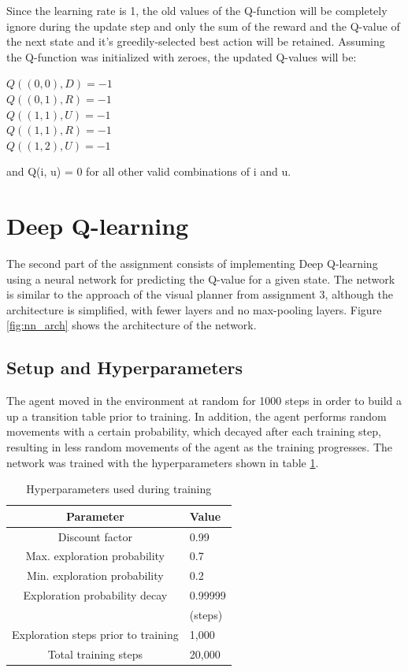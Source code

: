 \documentclass[a4paper, 11pt]{article}
\begin{document}
Since the learning rate is 1, the old values of the Q-function will be completely ignore during the update step and only the sum of the reward and the Q-value of the next state and it's greedily-selected best action will be retained. Assuming the Q-function was initialized with zeroes, the updated Q-values will be: 
\begin{center}
  $Q((0,0), D) = -1$ \\
  $Q((0,1), R) = -1$ \\ 
  $Q((1,1), U) = -1$ \\   
  $Q((1,1), R) = -1$ \\  
  $Q((1,2), U) = -1$ \\
\end{center}

and Q(i, u) = 0 for all other valid combinations of i and u.

\section{Deep Q-learning}
The second part of the assignment consists of implementing Deep Q-learning using a neural network for predicting the Q-value for a given state. The network is similar to the approach of the visual planner from assignment 3, although the architecture is simplified, with fewer layers and no max-pooling layers. Figure \ref{fig:nn_arch} shows the architecture of the network.

\subsection*{Setup and Hyperparameters}
The agent moved in the environment at random for 1000 steps in order to build a up a transition table prior to training. In addition, the agent performs random movements with a certain probability, which decayed after each training step, resulting in less random movements of the agent as the training progresses. The network was trained with the hyperparameters shown in table \ref{tbl:hyperparameters}.

\begin{table}[ht]
	\centering
    \footnotesize
	\begin{tabular}{cl}
		\toprule
		\textbf{Parameter}	&	\textbf{Value} \\
		\midrule
        Discount factor 	&	0.99 \\
        Max. exploration probability & 0.7 \\
        Min. exploration probability & 0.2 \\
        Exploration probability decay  & 0.99999 \\
        \midrule
        & (steps)\\
        Exploration steps prior to training 	&	1,000 \\
        Total training steps 	&	20,000 \\
		\bottomrule
    \end{tabular}
    \caption{Hyperparameters used during training}
    \label{tbl:hyperparameters}
\end{table}
\end{document}
